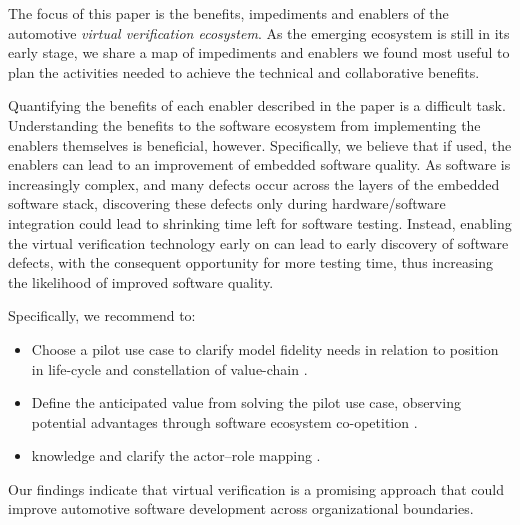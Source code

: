 The focus of this paper is the benefits, impediments and enablers of the automotive \emph{virtual verification ecosystem}.
As the emerging ecosystem is still in its early stage, we share a map of impediments and enablers we found most useful to plan the activities needed to achieve the technical and collaborative benefits.

Quantifying the benefits of each enabler described in the paper is a difficult task.
Understanding the benefits to the software ecosystem from implementing the enablers themselves is beneficial, however. 
Specifically, we believe that if used, the enablers can lead to an improvement of embedded software quality.
As software is increasingly complex, and many defects occur across the layers of the embedded software stack, discovering these defects only during hardware/software integration could lead to shrinking time left for software testing.
Instead, enabling the virtual verification technology early on can lead to early discovery of software defects, with the consequent opportunity for more testing time, thus increasing the likelihood of improved software quality.

Specifically, we recommend to:
\begin{itemize}
    \item Choose a pilot use case to clarify model fidelity needs in relation to position in life-cycle and constellation of value-chain \cite{Boehm1981}.
    \item Define the anticipated value from solving the pilot use case, observing potential advantages through software ecosystem co-opetition \cite{Agerfalk2008}.
    \item {}  knowledge and clarify the  actor--role mapping \cite{kilamo2012proprietary}.
\end{itemize}

Our findings indicate that virtual verification is a promising approach that could improve automotive software development across organizational boundaries.





